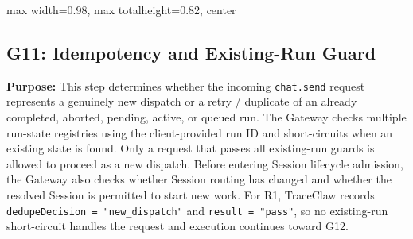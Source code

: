\begin{center}
\begin{adjustbox}{
max width=0.98\textwidth,
max totalheight=0.82\textheight,
center
}

\end{adjustbox}

\end{center}


\subsection*{G11: Idempotency and Existing-Run Guard}

\textbf{Purpose:}
This step determines whether the incoming \texttt{chat.send} request
represents a genuinely new dispatch or a retry / duplicate of an
already completed, aborted, pending, active, or queued run. The
Gateway checks multiple run-state registries using the client-provided
run ID and short-circuits when an existing state is found. Only a
request that passes all existing-run guards is allowed to proceed as
a new dispatch. Before entering Session lifecycle admission, the
Gateway also checks whether Session routing has changed and whether
the resolved Session is permitted to start new work. For R1,
TraceClaw records \texttt{dedupeDecision = "new\_dispatch"} and
\texttt{result = "pass"}, so no existing-run short-circuit handles
the request and execution continues toward G12.

